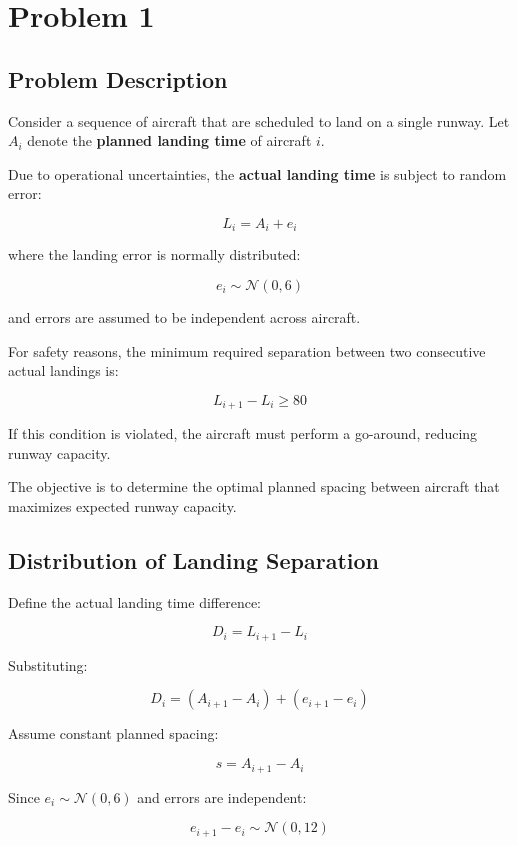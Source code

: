 \documentclass{KPS_assignment}
\begin{document}
\maketitle
\section*{Problem 1}

\subsection*{Problem Description}

Consider a sequence of aircraft that are scheduled to land on a single runway.  
Let $A_i$ denote the \textbf{planned landing time} of aircraft $i$.  

Due to operational uncertainties, the \textbf{actual landing time} is subject to random error:

\[
L_i = A_i + e_i
\]

where the landing error is normally distributed:

\[
e_i \sim \mathcal{N}(0,6)
\]

and errors are assumed to be independent across aircraft.

For safety reasons, the minimum required separation between two consecutive actual landings is:

\[
L_{i+1} - L_i \ge 80
\]

If this condition is violated, the aircraft must perform a go-around, reducing runway capacity.

The objective is to determine the optimal planned spacing between aircraft that maximizes expected runway capacity.

\subsection*{Distribution of Landing Separation}

Define the actual landing time difference:

\[
D_i = L_{i+1} - L_i
\]

Substituting:

\[
D_i = (A_{i+1} - A_i) + (e_{i+1} - e_i)
\]

Assume constant planned spacing:

\[
s = A_{i+1} - A_i
\]

Since $e_i \sim \mathcal{N}(0,6)$ and errors are independent:

\[
e_{i+1} - e_i \sim \mathcal{N}(0,12)
\]
\end{document}
